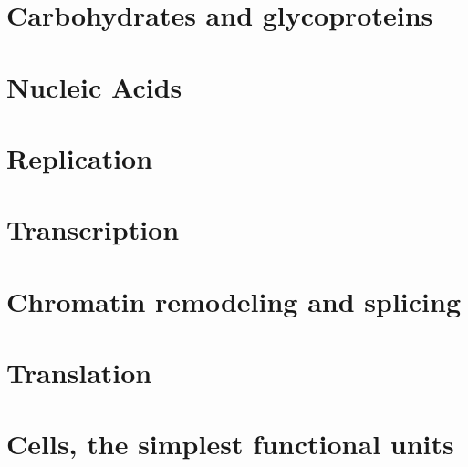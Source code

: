 \documentclass[../bio.tex]{subfiles}
\begin{document}
\section{Carbohydrates and glycoproteins}
\section{Nucleic Acids}
\section{Replication}
\section{Transcription}
\section{Chromatin remodeling and splicing}
\section{Translation}
\section{Cells, the simplest functional units}
\end{document}
